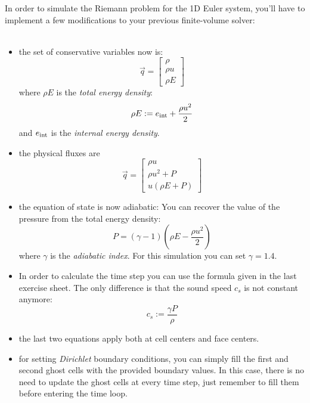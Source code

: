 In order to simulate the Riemann problem for the 1D Euler 
system, you'll have to implement a few modifications 
to your previous finite-volume solver: \\
\\
\begin{itemize}
    \item the set of conservative variables now is:
        \begin{equation}
            \vec q=
            \begin{bmatrix}
                \rho \\ \rho u \\ \rho E 
            \end{bmatrix}
        \end{equation}
        where $\rho E$ is the \textit{total energy density}:
        \begin{equation}
            \rho E:=e_\textnormal{int}+\frac{\rho u^2}{2}
        \end{equation}
        and $e_\textnormal{int}$ is the 
        \textit{internal energy density}.
    \item the physical fluxes are 
        \begin{equation}
            \vec q=
            \begin{bmatrix}
                \rho u \\ \rho u^2+P \\ u(\rho E+P) 
            \end{bmatrix}
        \end{equation}
    \item the equation of state is now adiabatic: You can 
        recover the value of the pressure from the total
        energy density:
        \begin{equation}
            P=(\gamma-1)(\rho E-\frac{\rho u^2}{2})
        \end{equation}
        where $\gamma$ is the \textit{adiabatic index}.
        For this simulation you can set $\gamma=1.4$.
    \item In order to calculate the time step you can 
        use the formula given in the last exercise sheet.
        The only difference is that the sound speed $c_s$
        is not constant anymore:
        \begin{equation}
            c_s:=\frac{\gamma P}{\rho}
        \end{equation}
    \item the last two equations apply both at 
        cell centers and face centers.
    \item for setting \textit{Dirichlet} boundary 
        conditions, you can simply fill the first and 
        second ghost cells with the provided boundary
        values. In this case, there is no need to update 
        the ghost cells at every time step, just remember
        to fill them before entering the time loop.
\end{itemize}
